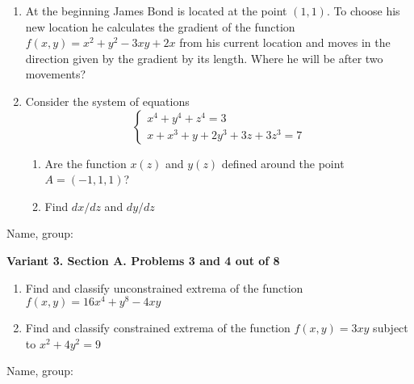 \documentclass[12pt,a4paper]{article}
\begin{document}
\begin{enumerate}

\item At the beginning James Bond is located at the point $(1, 1)$. To choose his new location he calculates the gradient of the function $f(x,y)=x^2+y^2 - 3xy+2x$ from his current location and moves in the direction given by the gradient by its length. Where he will be after two movements?

\item Consider the system of equations
\[
\begin{cases}
x^4 + y^4 + z^4 = 3 \\
x + x^3 + y + 2y^3 + 3z + 3z^3 = 7
\end{cases}
\]

\begin{enumerate}
\item Are the function $x(z)$ and $y(z)$ defined around the point $A=(-1,1,1)$?
\item Find $dx/dz$ and $dy/dz$
\end{enumerate}

\end{enumerate}

\begin{framed}
\begin{minipage}{42em}
Name, group:\vspace*{3ex}\par 
\noindent\dotfill
\end{minipage}
\end{framed}


\newpage
\textbf{Variant 3. Section A. Problems 3 and 4 out of 8}


\begin{enumerate}[resume]


\item Find and classify unconstrained extrema of the function $f(x,y)=16x^4 + y^8 - 4xy$

\item Find and classify constrained extrema of the function $f(x, y) =  3xy$ subject to $x^2 + 4y^2= 9$

\end{enumerate}

\begin{framed}
\begin{minipage}{42em}
Name, group:\vspace*{3ex}\par 
\noindent\dotfill
\end{minipage}
\end{framed}
\end{document}
